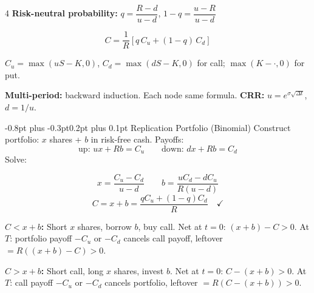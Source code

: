 \documentclass[6.5pt,landscape,a4paper]{extarticle}
\makeatletter
\renewcommand{\subsection}{\@startsection{subsection}{2}{0mm}%
  {-0.8pt plus -0.3pt}{0.2pt plus 0.1pt}%
  {\normalfont\bfseries\footnotesize\color{sub}}}
\makeatother
\begin{document}
\begin{multicols*}{4}
  \textbf{Risk-neutral probability:} $q=\dfrac{R-d}{u-d}$, $1-q=\dfrac{u-R}{u-d}$

  \begin{kbox}
    \[C=\frac{1}{R}[q\,C_u+(1-q)\,C_d]\]
  \end{kbox}
  $C_u=\max(uS-K,0)$, $C_d=\max(dS-K,0)$ for call; $\max(K-\cdot,0)$ for put.

  \textbf{Multi-period:} backward induction. Each node same formula. \textbf{CRR:} $u=e^{\sigma\sqrt{\Delta t}}$, $d=1/u$.

  \subsection{Replication Portfolio (Binomial)}
  Construct portfolio: $x$ shares + $b$ in risk-free cash. Payoffs:
  \[\text{up: }ux+Rb=C_u\qquad\text{down: }dx+Rb=C_d\]
  Solve:
  \begin{kbox}
    \[x=\frac{C_u-C_d}{u-d}\qquad b=\frac{uC_d-dC_u}{R(u-d)}\]
    \[C=x+b=\frac{qC_u+(1-q)C_d}{R}\quad\checkmark\]
  \end{kbox}
  \textbf{$C < x+b$:} Short $x$ shares, borrow $b$, buy call. Net at $t{=}0$: $(x+b)-C>0$. At $T$: portfolio payoff $-C_u$ or $-C_d$ cancels call payoff, leftover $= R((x+b)-C)>0$.

  \textbf{$C > x+b$:} Short call, long $x$ shares, invest $b$. Net at $t{=}0$: $C-(x+b)>0$. At $T$: call payoff $-C_u$ or $-C_d$ cancels portfolio, leftover $= R(C-(x+b))>0$.


\end{multicols*}
\end{document}
